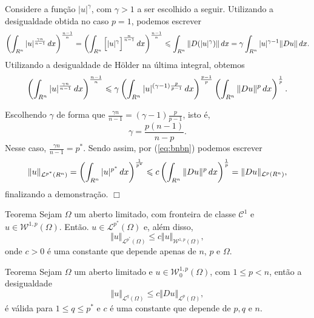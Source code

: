 \documentclass[xcolor=dvipsnames, aspectratio=169, 10pt]{beamer}
\let\mathbb\relax
\newcommand{\bR}{\mathbb{R}}
\newcommand{\cC}{\mathcal{C}}
\newcommand{\cL}{\mathcal{L}}
\newcommand{\cW}{\mathcal{W}}
\begin{document}
\begin{frame}
    \vspace{-5mm}
    \vspace{5mm}

    Considere a função $|u|^\gamma$, com $\gamma > 1$ a ser escolhido a seguir. Utilizando a desigualdade obtida no caso $p = 1$, podemos escrever
    \[
        \left( \int_{\bR^n} |u|^{\frac{\gamma n}{n - 1}}  \, dx\right)^{\frac{n-1}{n}} = \left( \int_{\bR^n} \Big[ |u|^\gamma \Big]^{\frac{n}{n-1}} \,dx \right)^{\frac{n-1}{n}} \leqslant \int_{\bR^n} \Vert D(|u|^{\gamma}) \Vert \,dx = \gamma \int_{\bR^n} |u|^{\gamma-1} \Vert Du \Vert \,dx.
    \]
    Utilizando a desigualdade de Hölder na última integral, obtemos
    \begin{equation} \label{eq:bnbn}
        \left( \int_{\bR^n} |u|^{\frac{\gamma n}{n - 1}}  \, dx\right)^{\frac{n-1}{n}} \leqslant \gamma\left( \int_{\bR^n} |u|^{(\gamma-1)\frac{p}{p-1}} \,dx \right)^{\frac{p-1}{p}} \left( \int_{\bR^n} \Vert Du \Vert^p \,dx \right)^{\frac{1}{p}}.
    \end{equation}
\end{frame}
\begin{frame}
    Escolhendo $\gamma$ de forma que $\displaystyle\frac{\gamma n}{n - 1} = (\gamma -1)\frac{p}{p-1}$, isto é,
    \[
        \gamma = \frac{p(n-1)}{n-p}.
    \]
    Nesse caso, $\displaystyle\frac{\gamma n}{n-1} = p^*$. Sendo assim, por (\ref{eq:bnbn}) podemos escrever
    \[
        \Vert u \Vert_{\cL^{p^*}(\bR^n)} = \left( \int_{\bR^n} |u|^{p^*} \,dx \right)^{\frac{1}{p^*}} \leqslant c \left( \int_{\bR^n} \Vert Du \Vert^p \,dx\right)^{\frac{1}{p}} = \Vert Du \Vert_{\cL^p(\bR^n)},
    \]
    finalizando a demonstração. \hfill $\Box$
\end{frame}
\begin{frame}
    \begin{block}{Teorema}
         Sejam $\Omega$ um aberto limitado, com fronteira de classe $\cC^1$ e $u \in \cW^{1,p}(\Omega)$. Então. $u \in \cL^{p^*}(\Omega)$ e, além disso,
        \[
            \Vert u \Vert_{\cL^{p^*}(\Omega)} \leqslant c \Vert u \Vert_{\cW^{1,p}(\Omega)},
        \]
        onde $c > 0$ é uma constante que depende apenas de $n$, $p$ e $\Omega$.
    \end{block}
\end{frame}
\begin{frame}
    \begin{block}{Teorema}
        Sejam $\Omega$ um aberto limitado e $u \in \cW^{1,p}_0(\Omega)$, com $1 \leqslant p < n$, então a desigualdade
        \begin{equation} \label{eq:poincaregen}
            \Vert u \Vert_{\cL^q(\Omega)} \leqslant c \Vert Du \Vert_{\cL^p(\Omega)},
        \end{equation}
        é válida para $1 \leqslant q \leqslant p^*$ e $c$ é uma constante que depende de $p, q$ e $n$.
    \end{block}
\end{frame}
\end{document}
